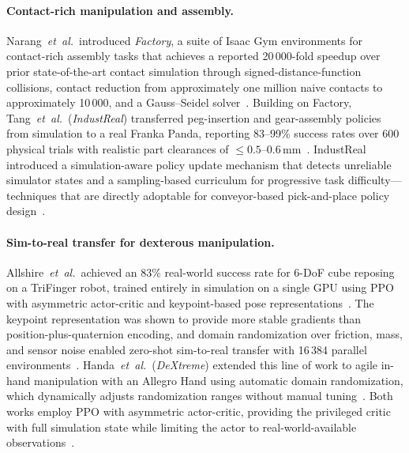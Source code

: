 \paragraph{Contact-rich manipulation and assembly.}
Narang~\emph{et~al.}\ introduced \emph{Factory}, a suite of Isaac Gym
environments for contact-rich assembly tasks that achieves a reported
20\,000-fold speedup over prior state-of-the-art contact simulation
through signed-distance-function collisions, contact reduction from
approximately one million naive contacts to approximately 10\,000, and a
Gauss--Seidel solver~\cite{Narang2022Factory}.
Building on Factory, Tang~\emph{et~al.}\ (\emph{IndustReal}) transferred
peg-insertion and gear-assembly policies from simulation to a real Franka
Panda, reporting 83--99\% success rates over 600 physical trials with
realistic part clearances of $\leq 0.5$--$0.6\,\text{mm}$~\cite{Tang2023IndustReal}.
IndustReal introduced a simulation-aware policy update mechanism that detects
unreliable simulator states and a sampling-based curriculum for progressive
task difficulty---techniques that are directly adoptable for conveyor-based
pick-and-place policy design~\cite{Tang2023IndustReal}.

\paragraph{Sim-to-real transfer for dexterous manipulation.}
Allshire~\emph{et~al.}\ achieved an 83\% real-world success rate for
6-\ac{DoF} cube reposing on a TriFinger robot, trained entirely in simulation
on a single GPU using \ac{PPO} with asymmetric actor-critic and
keypoint-based pose representations~\cite{Allshire2022TriFinger}.
The keypoint representation was shown to provide more stable gradients than
position-plus-quaternion encoding, and domain randomization over friction,
mass, and sensor noise enabled zero-shot sim-to-real transfer with 16\,384
parallel environments~\cite{Allshire2022TriFinger}.
Handa~\emph{et~al.}\ (\emph{DeXtreme}) extended this line of work to agile
in-hand manipulation with an Allegro Hand using automatic domain
randomization, which dynamically adjusts randomization ranges without manual
tuning~\cite{Handa2023DeXtreme}.
Both works employ \ac{PPO} with asymmetric actor-critic, providing the
privileged critic with full simulation state while limiting the actor to
real-world-available observations~\cite{Allshire2022TriFinger,Handa2023DeXtreme}.


